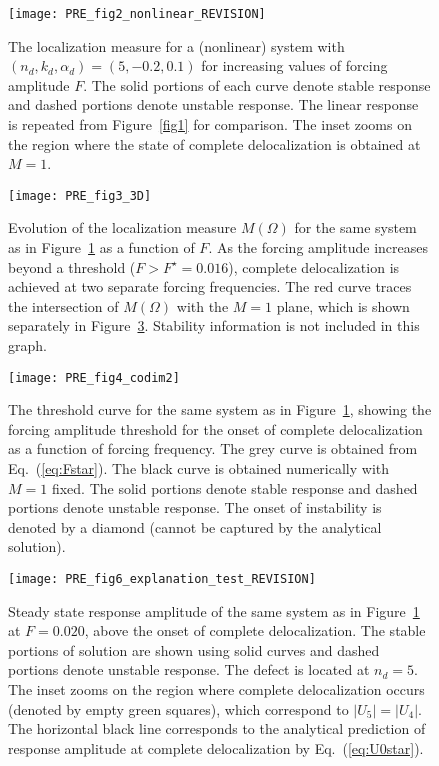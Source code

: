 \documentclass[aps,pre,twocolumn,groupedaddress]{revtex4-1}
\begin{document}
\begin{figure}[bt]
	\texttt{[image: PRE\_fig2\_nonlinear\_REVISION]}
	\caption{
		\label{fig2} 
		The localization measure for a (nonlinear) system with $(n_d,k_d,\alpha_d)=(5,-0.2,0.1)$ for increasing values of forcing amplitude $F$. The solid portions of each curve denote stable response and dashed portions denote unstable response. The linear response is repeated from Figure~\ref{fig1} for comparison. The inset zooms on the region where the state of complete delocalization is obtained at $M=1$. 
	}
\end{figure}

\begin{figure}[bt]
	\texttt{[image: PRE\_fig3\_3D]}
	\caption{
		\label{fig3} 
		Evolution of the localization measure $M(\Omega)$ for the same system as in Figure~\ref{fig2} as a function of $F$. As the forcing amplitude increases beyond a threshold ($F>F^{\star}=0.016$), complete delocalization is achieved at two separate forcing frequencies. The red curve traces the intersection of $M(\Omega)$ with the $M=1$ plane, which is shown separately in Figure~\ref{fig4}. Stability information is not included in this graph. 
	}
\end{figure}

\begin{figure}[bt]
	\texttt{[image: PRE\_fig4\_codim2]}
	\caption{
		\label{fig4} 
		The threshold curve for the same system as in Figure~\ref{fig2}, showing the  forcing amplitude threshold for the onset of complete delocalization as a function of forcing frequency. The grey curve is obtained from Eq.~(\ref{eq:Fstar}). The black curve is obtained numerically with $M=1$ fixed. The solid portions denote stable response and dashed portions denote unstable response. The onset of instability is denoted by a diamond (cannot be captured by the analytical solution). 
	}
\end{figure}

\begin{figure}[bt]
	\texttt{[image: PRE\_fig6\_explanation\_test\_REVISION]}
	\caption{
		\label{fig5} 
		Steady state response amplitude of the same system as in Figure~\ref{fig2} at $F=0.020$, above the onset of complete delocalization. The stable portions of solution are shown using solid curves and dashed portions denote unstable response. The defect is located at $n_d=5$. 
		The inset zooms on the region where complete delocalization occurs {\color{black}(denoted by empty green squares)}, which correspond to $|U_5|=|U_4|$. The horizontal black line corresponds to the analytical prediction of response amplitude at complete delocalization by Eq.~(\ref{eq:U0star}). %
		}
\end{figure}
\end{document}

